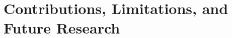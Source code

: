 \section{Contributions, Limitations, and Future Research} %
\label{sec:contributions_limitations_and_future_research}

